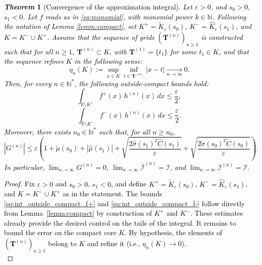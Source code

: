 \documentclass[review]{elsarticle}
\newcommand{\cblue}{\textcolor{black}}
\newtheorem{theorem}{\em Theorem}
\begin{document}
\cblue{
\begin{theorem}[Convergence of the approximation integral]
\label{th1:convergence}
Let $\varepsilon > 0$, and $s_0 > 0$, $s_1 < 0$. \cblue{Let $f$ reads as in \eqref{eq:monomial}, with monomial power $k \in \mathbb{N}$.} Following the notation of Lemma \ref{lemm:compact}, set $K^+= \widetilde{K}_\varepsilon(s_0)$, $K^-=\widehat{K}_\varepsilon(s_1)$, and $K= K^- \cup K^+$. Assume that the sequence of grids $(\mathbf{T}^{(n)})_{n\ge 1}$ is constructed such that for all $n\ge1$, $\mathbf{T}^{(n)} \subset K$, with $\mathbf{T}^{(1)}=\{t_1\}$ for some $t_1\in K$, and that the sequence refines $K$ in the following sense:
\begin{equation}\label{eq:H-net_thm}
\eta_n(K) := \sup_{x\in K}\inf_{t\in\mathbf{T}^{(n)}}|x-t| \xrightarrow[n\to\infty]{} 0.
\end{equation}
Then, for every $n\in\mathbb{N}^*$, the following \emph{outside-compact} bounds hold:
\begin{equation} \label{eq:int_outside_compact_f+}
\int_{\mathbb{R} \setminus K^+} f^+(x)\, h^{(n)}(x) \, dx \leq \frac{\varepsilon}{2},
\end{equation}
\begin{equation} \label{eq:int_outside_compact_f-}
\int_{\mathbb{R} \setminus K^-} f^-(x)\, h^{(n)}(x) \, dx \leq \frac{\varepsilon}{2}.
\end{equation}
Moreover, there exists $n_0 \in \mathbb{N}^*$ such that, for all $n \ge n_0$,
\begin{equation}
\label{eq:global_G_bound}
\left| G^{(n)} \right| \leq \varepsilon \left(1 + \widetilde{\mu}(s_0) + |\widehat{\mu}(s_1)| + \sqrt{\frac{2 \widehat{\sigma}(s_1)^2 \widehat{C}(s_1)}{\varepsilon}} + \sqrt{\frac{2 \widetilde{\sigma}(s_0)^2 \widetilde{C}(s_0)}{\varepsilon}} \right).
\end{equation}
In particular, $\lim_{n \rightarrow \infty} G^{(n)} = 0$,  $\lim_{n \rightarrow \infty} \overline{\mathcal{I}}^{(n)} = \mathcal{I}$, and $\lim_{n \rightarrow \infty} \underline{\mathcal{I}}^{(n)} = \mathcal{I}$.
\end{theorem}
%
\begin{proof}
Fix $\varepsilon>0$ and $s_0>0$, $s_1<0$, and define $K^+=\widetilde K_\varepsilon(s_0)$, $K^-=\widehat K_\varepsilon(s_1)$, and $K=K^-\cup K^+$ as in the statement. The bounds \eqref{eq:int_outside_compact_f+} and \eqref{eq:int_outside_compact_f-} follow directly from Lemma~\ref{lemm:compact} by construction of $K^+$ and $K^-$. These estimates already provide the desired control on the tails of the integral. It remains to bound the error on the compact core $K$. By hypothesis, the elements of $(\mathbf{T}^{(n)})_{n\ge 1}$ belong to $K$ and refine it (i.e., $\eta_n(K) \to 0$). \\

\end{proof}}
\end{document}

